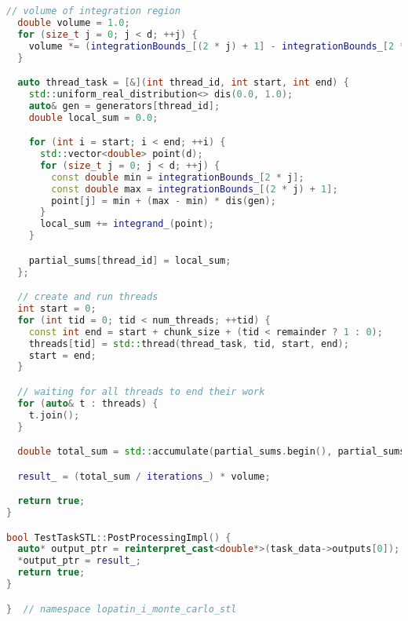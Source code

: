 \documentclass[12pt,a4paper]{extarticle}
\begin{document}
\begin{lstlisting}[language=C++]
  // volume of integration region
  double volume = 1.0;
  for (size_t j = 0; j < d; ++j) {
    volume *= (integrationBounds_[(2 * j) + 1] - integrationBounds_[2 * j]);
  }

  auto thread_task = [&](int thread_id, int start, int end) {
    std::uniform_real_distribution<> dis(0.0, 1.0);
    auto& gen = generators[thread_id];
    double local_sum = 0.0;

    for (int i = start; i < end; ++i) {
      std::vector<double> point(d);
      for (size_t j = 0; j < d; ++j) {
        const double min = integrationBounds_[2 * j];
        const double max = integrationBounds_[(2 * j) + 1];
        point[j] = min + (max - min) * dis(gen);
      }
      local_sum += integrand_(point);
    }

    partial_sums[thread_id] = local_sum;
  };

  // create and run threads
  int start = 0;
  for (int tid = 0; tid < num_threads; ++tid) {
    const int end = start + chunk_size + (tid < remainder ? 1 : 0);
    threads[tid] = std::thread(thread_task, tid, start, end);
    start = end;
  }

  // waiting for all threads to end their work
  for (auto& t : threads) {
    t.join();
  }

  double total_sum = std::accumulate(partial_sums.begin(), partial_sums.end(), 0.0);

  result_ = (total_sum / iterations_) * volume;

  return true;
}

bool TestTaskSTL::PostProcessingImpl() {
  auto* output_ptr = reinterpret_cast<double*>(task_data->outputs[0]);
  *output_ptr = result_;
  return true;
}

}  // namespace lopatin_i_monte_carlo_stl

\end{lstlisting}
\end{document}
